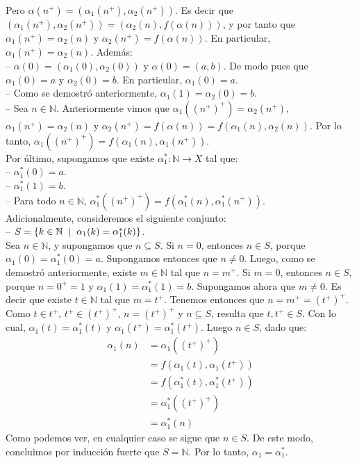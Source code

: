 \documentclass[10 pt]{article}
\begin{document}
\Large{Pero $\alpha(n^+)=(\alpha_1(n^+),\alpha_2(n^+))$. Es decir que $(\alpha_1(n^+),\alpha_2(n^+))=(\alpha_2(n),f(\alpha(n)))$, y por tanto que $\alpha_1(n^+)=\alpha_2(n)$ y $\alpha_2(n^+)=f(\alpha(n))$. En particular, $\alpha_1(n^+)=\alpha_2(n)$. Además: \\

-- $\alpha(0)=(\alpha_1(0),\alpha_2(0))$ y $\alpha(0)=(a,b)$. De modo pues que $\alpha_1(0)=a$ y $\alpha_2(0)=b$. En particular, $\alpha_1(0)=a$. \\

-- Como se demostró anteriormente, $\alpha_1(1)=\alpha_2(0)=b$. \\

-- Sea $n \in \mathbb N$. Anteriormente vimos que $\alpha_1((n^+)^+)=\alpha_2(n^+)$, $\alpha_1(n^+)=\alpha_2(n)$ y $\alpha_2(n^+)=f(\alpha(n))=f(\alpha_1(n),\alpha_2(n))$. Por lo tanto, $\alpha_1((n^+)^+)=f(\alpha_1(n),\alpha_1(n^+))$. \\

Por último, supongamos que existe $\alpha_1^*: \mathbb N \rightarrow X$ tal que: \\

-- $\alpha_1^*(0)=a$. \\

-- $\alpha_1^*(1)=b$. \\

-- Para todo $n \in \mathbb N$, $\alpha_1^*((n^+)^+)=f(\alpha_1^*(n),\alpha_1^*(n^+))$. \\

Adicionalmente, consideremos el siguiente conjunto: \\

-- $S=\{k \in \mathbb N \hspace{0.2 cm}|\hspace{0.2 cm} \alpha_1(k)=\alpha_1^*(k)\}$. \\

Sea $n \in \mathbb N$, y supongamos que $n \subseteq S$. Si $n=0$, entonces $n \in S$, porque $\alpha_1(0)=\alpha_1^*(0)=a$. Supongamos entonces que $n \neq 0$. Luego, como se demostró anteriormente, existe $m \in \mathbb N$ tal que $n=m^+$. Si $m=0$, entonces $n \in S$, porque $n=0^+=1$ y $\alpha_1(1)=\alpha_1^*(1)=b$. Supongamos ahora que $m \neq 0$. Es decir que existe $t \in \mathbb N$ tal que $m=t^+$. Tenemos entonces que $n=m^+=(t^+)^+$. Como $t \in t^+$, $t^+ \in (t^+)^+$, $n=(t^+)^+$ y $n \subseteq S$, resulta que $t,t^+ \in S$. Con lo cual, $\alpha_1(t)=\alpha_1^*(t)$ y $\alpha_1(t^+)=\alpha_1^*(t^+ )$. Luego $n \in S$, dado que:}
\begin{align*}
    \alpha_1(n)&=\alpha_1((t^+)^+) \\
    &=f(\alpha_1(t),\alpha_1(t^+)) \\
    &=f(\alpha_1^*(t),\alpha_1^*(t^+)) \\
    &=\alpha_1^*((t^+)^+) \\
    &=\alpha_1^*(n)
\end{align*}
\Large{Como podemos ver, en cualquier caso se sigue que $n \in S$. De este modo, concluimos por inducción fuerte que $S=\mathbb N$. Por lo tanto, $\alpha_1=\alpha_1^*$.} \\
\end{document}
